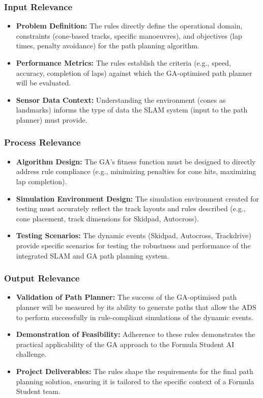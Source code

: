 \subsubsection{Input Relevance}
\begin{itemize}
    \item \textbf{Problem Definition:} The rules directly define the operational domain, constraints (cone-based tracks, specific manoeuvres), and objectives (lap times, penalty avoidance) for the path planning algorithm.
    \item \textbf{Performance Metrics:} The rules establish the criteria (e.g., speed, accuracy, completion of laps) against which the GA-optimised path planner will be evaluated.
    \item \textbf{Sensor Data Context:} Understanding the environment (cones as landmarks) informs the type of data the SLAM system (input to the path planner) must provide.
\end{itemize}

\subsubsection{Process Relevance}
\begin{itemize}
    \item \textbf{Algorithm Design:} The GA's fitness function must be designed to directly address rule compliance (e.g., minimizing penalties for cone hits, maximizing lap completion).
    \item \textbf{Simulation Environment Design:} The simulation environment created for testing must accurately reflect the track layouts and rules described (e.g., cone placement, track dimensions for Skidpad, Autocross).
    \item \textbf{Testing Scenarios:} The dynamic events (Skidpad, Autocross, Trackdrive) provide specific scenarios for testing the robustness and performance of the integrated SLAM and GA path planning system.
\end{itemize}

\subsubsection{Output Relevance}
\begin{itemize}
    \item \textbf{Validation of Path Planner:} The success of the GA-optimised path planner will be measured by its ability to generate paths that allow the ADS to perform successfully in rule-compliant simulations of the dynamic events.
    \item \textbf{Demonstration of Feasibility:} Adherence to these rules demonstrates the practical applicability of the GA approach to the Formula Student AI challenge.
    \item \textbf{Project Deliverables:} The rules shape the requirements for the final path planning solution, ensuring it is tailored to the specific context of a Formula Student team.
\end{itemize}

